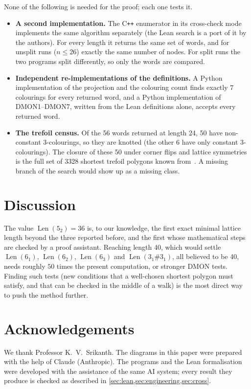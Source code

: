 \documentclass[11pt]{article}
\theoremstyle{plain}
\theoremstyle{definition}
\theoremstyle{remark}
\newcommand{\Len}{\operatorname{Len}}
\newcommand{\dmon}[1]{\textup{DMON#1}}
\begin{document}
None of the following is needed for the proof; each one tests it.
\begin{itemize}
\item \textbf{A second implementation.} The C\texttt{++} enumerator in its cross-check mode implements
the same algorithm separately (the Lean search is a port of it by the authors). For every length it
returns the same set of words, and for unsplit runs ($n\le26$) exactly the same number of nodes. For
split runs the two programs split differently, so only the words are compared.
\item \textbf{Independent re-implementations of the definitions.} A Python implementation of the
projection and the colouring count finds exactly $7$ colourings for every returned word, and a Python
implementation of \dmon1--\dmon7, written from the Lean definitions alone, accepts every returned word.
\item \textbf{The trefoil census.} Of the 56 words returned at length 24, 50 have non-constant
$3$-colourings, so they are knotted (the other 6 have only constant $3$-colourings). The closure of
these 50 under corner flips and lattice symmetries is the full set of 3328 shortest trefoil polygons
known from~\cite{JvRR11}. A missing branch of the search would show up as a missing class.
\end{itemize}

\section{Discussion}\label{sec:discussion}

The value $\Len(5_2)=36$ is, to our knowledge, the first exact minimal lattice length beyond the three
reported before, and the first whose mathematical steps are checked by a proof assistant. Reaching length 40, which would settle $\Len(6_1)$, $\Len(6_2)$,
$\Len(6_3)$ and $\Len(3_1\#3_1)$, all believed to be 40, needs roughly $50$ times the present
computation, or stronger DMON tests. Finding such tests (new conditions that a well-chosen shortest
polygon must satisfy, and that can be checked in the middle of a walk) is the most direct way to push
the method further.

\section*{Acknowledgements}
We thank Professor K.~V.~Srikanth. The diagrams in this paper were prepared with the help of Claude
(Anthropic). The programs and the Lean formalisation were developed with the assistance of the same AI
system; every result they produce is checked as described in \cref{sec:lean,sec:engineering,sec:cross}.



\end{document}
